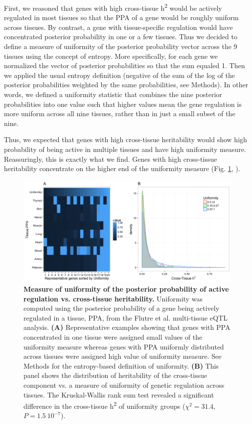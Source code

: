 \documentclass[10pt,letterpaper]{article}
\begin{document}
First, we reasoned that genes with high cross-tissue h\textsuperscript{2} would be actively regulated in most tissues so that the PPA of a gene would be roughly uniform across tissues. By contrast, a gene with tissue-specific regulation would have concentrated posterior probability in one or a few tissues. Thus we decided to define a measure of uniformity of the posterior probability vector across the 9 tissues using the concept of entropy. More specifically, for each gene we normalized the vector of posterior probabilities so that the sum equaled 1. Then we applied the usual entropy definition (negative of the sum of the log of the posterior probabilities weighted by the same probabilities, see Methods). In other words, we defined a uniformity statistic that combines the nine posterior probabilities into one value such that higher values mean the gene regulation is more uniform across all nine tissues, rather than in just a small subset of the nine.

Thus, we expected that genes with high cross-tissue heritability would show high probability of being active in multiple tissues and have high uniformity measure. Reassuringly, this is exactly what we find. Genes with high cross-tissue heritability concentrate on the higher end of the uniformity measure (Fig. \ref{fig-ct-entropy}, ). 

\begin{figure}[H]
\includegraphics[width=13cm]{Figures/Fig-CT-entropy-ppa.png}
\caption{{\bf Measure of uniformity of the posterior probability of active regulation vs. cross-tissue heritability.}
Uniformity was computed using the posterior probability of a gene being actively regulated in a tissue, PPA, from the Flutre et al. \cite{Flutre_2013} multi-tissue eQTL analysis. {\bf (A)} Representative examples showing that genes with PPA concentrated in one tissue were assigned small values of the uniformity measure whereas genes with PPA uniformly distributed across tissues were assigned high value of uniformity measure. See Methods for the entropy-based definition of uniformity. {\bf (B)}  This panel shows the distribution of heritability of the cross-tissue component vs. a measure of uniformity of genetic regulation across tissues. 
The Kruskal-Wallis rank sum test revealed a significant difference in the cross-tissue h\textsuperscript{2} of uniformity groups ($\chi^2 = 31.4$, $P = 1.5~10^{-7}$).}
\label{fig-ct-entropy}
\end{figure}
\end{document}
